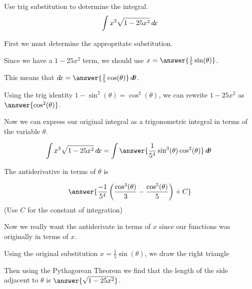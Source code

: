 \documentclass{ximera}
\author{Jason Miller}
\begin{document}
\begin{exercise}
Use trig substitution to determine the integral.
\[
\int x^{3} \sqrt{1-25x^{2}} \mathop{}\!d\! x
\]

First we must determine the appropritate substitution. 

Since we have a $1-25x^{2}$ term, we should use $x=\answer{\frac{1}{5}\sin(\theta)}$. 

This means that $\d x= \answer{\frac{1}{5}\cos(\theta)} \d \theta$. 

\begin{exercise}
Using the trig identity $1-\sin^{2}(\theta)=\cos^{2}(\theta)$, we can rewrite $1-25x^{2}$ as $\answer{\cos^{2}(\theta)}$. 

Now we can express our original integral as a trigonometric integral in terms of the variable $\theta$. 

\[
\int  x^{3} \sqrt{1-25x^{2}} \d x= \int \answer{  \frac{1}{5^{4}} \sin^{3}(\theta) \cos^{2}(\theta)  } \d \theta\
\]

The antiderivative in terms of $\theta$ is 

\[
\answer{ \frac{-1}{5^{4}}\left( \frac{\cos^{3}(\theta)}{3} -\frac{\cos^{5}(\theta)}{5} \right) + C}
\]
(Use $C$ for the constant of integration)


Now we really want the antiderivate in terms of $x$ since our functions was originally in terms of $x$. 

\begin{exercise}
Using the original substitution $x=\frac{1}{5}\sin(\theta)$, we draw the right triangle 

    \begin{image}
    \end{image}

Then using the Pythagorean Theorem we find that the
 length of the side adjacent to $\theta$ is $\answer{\sqrt{1-25x^{2}}}$. 


\end{exercise}
\end{exercise}
\end{exercise}
\end{document}
